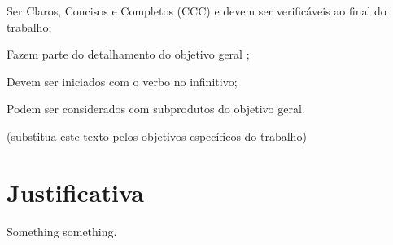 Ser Claros, Concisos e Completos (CCC) e devem ser verificáveis ao final do trabalho;

Fazem parte do detalhamento do objetivo geral ;

Devem ser iniciados com o verbo no infinitivo;

Podem ser considerados com subprodutos do objetivo geral.

(substitua este texto pelos objetivos específicos do trabalho)

\section{Justificativa}
\label{sec:justif}

Something something. \\ \\

  



